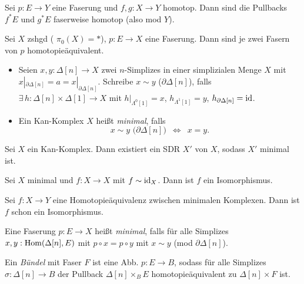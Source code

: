 \documentclass{cheat-sheet}
\begin{document}
\begin{kor}
  Sei $p : E \to Y$ eine Faserung und $f, g : X \to Y$ homotop.
  Dann sind die Pullbacks $f^* E$ und $g^* E$ faserweise homotop (also mod $Y$).
\end{kor}

\begin{kor}
  Sei $X$ zshgd (\dh{} $\pi_0(X) = *$), $p : E \to X$ eine Faserung.
  Dann sind je zwei Fasern von $p$ homotopieäquivalent.
\end{kor}


\begin{defn}
  \begin{itemize}
    \item Seien $x, y : \Delta[n] \to X$ zwei $n$-Simplizes in einer simplizialen Menge $X$ mit $x|_{\partial \Delta[n]} = a = x|_{\partial \Delta[n]}$.
    Schreibe $x \sim y$ ($\partial \Delta[n]$), falls $\exists \, h : \Delta[n] \times \Delta[1] \to X$ mit $h|_{\Lambda^0[1]} = x$, $h_{\Lambda^1[1]} = y$, $h_{\partial \Delta[n]} = \operatorname{id}$.
    \item Ein Kan-Komplex $X$ heißt \emph{minimal}, falls
    \[ x \sim y \text{ ($\partial \Delta[n]$)} \enspace\iff\enspace x = y. \]
  \end{itemize}
\end{defn}

\begin{lem}
  Sei $X$ ein Kan-Komplex. Dann existiert ein SDR $X'$ von $X$, sodass $X'$ minimal ist.
\end{lem}

\begin{lem}
  Sei $X$ minimal und $f : X \to X$ mit $f \sim \operatorname{id}_X$. Dann ist $f$ ein Isomorphismus.
\end{lem}

\begin{kor}
  Sei $f : X \to Y$ eine Homotopieäquivalenz zwischen minimalen Komplexen.
  Dann ist $f$ schon ein Isomorphismus.
\end{kor}

\begin{defn}
  Eine Faserung $p : E \to X$ heißt \emph{minimal}, falls für alle Simplizes $x, y : \operatorname{Hom}(\Delta[n], E)$ mit $p \circ x = p \circ y$ mit $x \sim y$ (mod $\partial \Delta[n]$).
\end{defn}

\begin{defn}
  Ein \emph{Bündel} mit Faser $F$ ist eine Abb. $p : E \to B$, sodass für alle Simplizes $\sigma : \Delta[n] \to B$ der Pullback $\Delta[n] \times_B E$ homotopieäquivalent zu $\Delta[n] \times F$ ist.
\end{defn}
\end{document}
